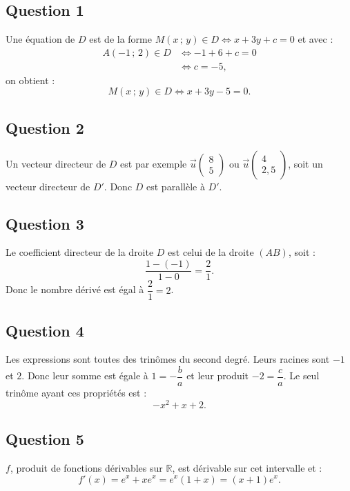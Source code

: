 \subsection*{Question 1}
	Une équation de \(D\) est de la forme \(M (x\,;\,y) \in D \iff x + 3y + c = 0\) et avec :
	\begin{align*}
		A(-1\,;\,2) \in D &\iff -1 + 6 + c = 0 \\
		&\iff c = -5,
	\end{align*}
	on obtient :
	\[
	M (x\,;\,y) \in D \iff x + 3y - 5 = 0.
	\]
	
	\subsection*{Question 2}
	Un vecteur directeur de \(D\) est par exemple \(\vec{u} \begin{pmatrix} 8 \\ 5 \end{pmatrix}\) ou \(\vec{u}\begin{pmatrix} 4 \\ 2,5 \end{pmatrix}\), soit un vecteur directeur de \(D'\). Donc \(D\) est parallèle à \(D'\).
	
	\subsection*{Question 3}
	Le coefficient directeur de la droite \(D\) est celui de la droite \((AB)\), soit :
	\[
	\dfrac{1 - (-1)}{1 - 0} = \dfrac{2}{1}.
	\]
	Donc le nombre dérivé est égal à \( \dfrac{2}{1} = 2 \).
	
	\subsection*{Question 4}
	Les expressions sont toutes des trinômes du second degré. Leurs racines sont \(-1\) et \(2\). Donc leur somme est égale à \(1 = -\dfrac{b}{a}\) et leur produit \(-2 = \dfrac{c}{a}\). Le seul trinôme ayant ces propriétés est :
	\[
	-x^2 + x + 2.
	\]
	
	\subsection*{Question 5}
	\(f\), produit de fonctions dérivables sur \(\mathbb{R}\), est dérivable sur cet intervalle et :
	\[
	f'(x) = e^x + x e^x = e^x (1 + x) = (x + 1) e^x.
	\]
